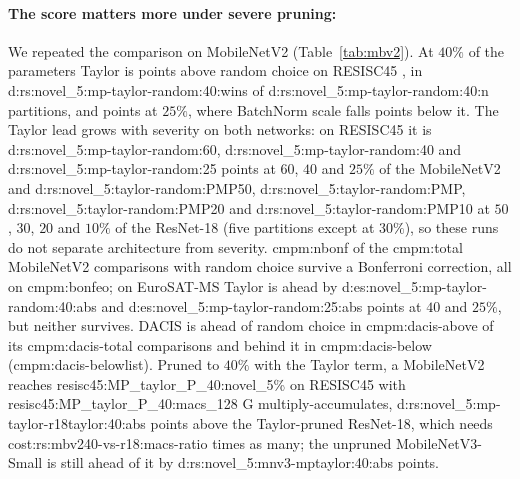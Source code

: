 \begin{table}[t]
  \centering\small\setlength{\tabcolsep}{4pt}
  
  \caption{MobileNetV2 pruned with five scores (schedule P): 5-shot accuracy (\%), mean over ten partitions.}
  \label{tab:mbv2}
\end{table}

\paragraph{The score matters more under severe pruning:}
We repeated the comparison on MobileNetV2 (Table~\ref{tab:mbv2}). At $40\%$ of the parameters Taylor is  points above random choice on RESISC45 , in \num{d:rs:novel_5:mp-taylor-random:40:wins} of \num{d:rs:novel_5:mp-taylor-random:40:n} partitions, and  points at $25\%$, where BatchNorm scale falls  points below it. The Taylor lead grows with severity on both networks: on RESISC45 it is \num{d:rs:novel_5:mp-taylor-random:60}, \num{d:rs:novel_5:mp-taylor-random:40} and \num{d:rs:novel_5:mp-taylor-random:25} points at $60$, $40$ and $25\%$ of the MobileNetV2 and \num{d:rs:novel_5:taylor-random:PMP50}, \num{d:rs:novel_5:taylor-random:PMP}, \num{d:rs:novel_5:taylor-random:PMP20} and \num{d:rs:novel_5:taylor-random:PMP10} at $50$, $30$, $20$ and $10\%$ of the ResNet-18 (five partitions except at $30\%$), so these runs do not separate architecture from severity. \num{cmpm:nbonf} of the \num{cmpm:total} MobileNetV2 comparisons with random choice survive a Bonferroni correction, all on \num{cmpm:bonfeo}; on EuroSAT-MS Taylor is ahead by \num{d:es:novel_5:mp-taylor-random:40:abs} and \num{d:es:novel_5:mp-taylor-random:25:abs} points at $40$ and $25\%$, but neither survives. DACIS is ahead of random choice in \num{cmpm:dacis-above} of its \num{cmpm:dacis-total} comparisons and behind it in \num{cmpm:dacis-below} (\num{cmpm:dacis-belowlist}). Pruned to $40\%$ with the Taylor term, a MobileNetV2 reaches \num{resisc45:MP_taylor_P_40:novel_5}\% on RESISC45 with \num{resisc45:MP_taylor_P_40:macs_128} G multiply-accumulates, \num{d:rs:novel_5:mp-taylor-r18taylor:40:abs} points above the Taylor-pruned ResNet-18, which needs \num{cost:rs:mbv240-vs-r18:macs-ratio} times as many; the unpruned MobileNetV3-Small is still ahead of it by \num{d:rs:novel_5:mnv3-mptaylor:40:abs} points.

